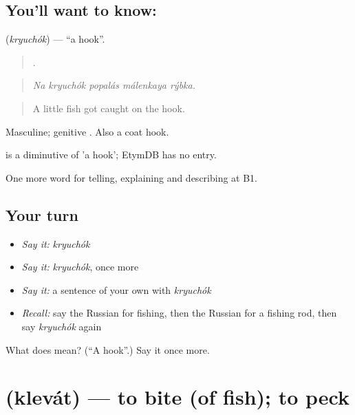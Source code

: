 \subsection*{You'll want to know: }
\textbf{} (\emph{kryuchók}) — \textquotedblleft{}a hook\textquotedblright{}.

\begin{quote}
    .
\end{quote}

\begin{quote}
\emph{Na kryuchók popalás málenkaya rýbka.}
\end{quote}

\begin{quote}
A little fish got caught on the hook.
\end{quote}

Masculine; genitive . Also a coat hook.

\begin{cousinweb}
\emph{} is a diminutive of \emph{} 'a hook'; EtymDB has no entry.
\end{cousinweb}

\begin{grammarlens}[title={What you've built}]
One more word for telling, explaining and describing at B1.
\end{grammarlens}

\subsection*{Your turn}
\begin{itemize}
\raggedright
  \item \emph{Say it:} \emph{kryuchók}
  \item \emph{Say it:} \emph{kryuchók}, once more
  \item \emph{Say it:} a sentence of your own with \emph{kryuchók}
  \item \emph{Recall:} say the Russian for fishing, then the Russian for a fishing rod, then say \emph{kryuchók} again
\end{itemize}

\begin{tcolorbox}[breakable,colback=teal!4,colframe=teal!35!black,title={Before you move on}]
What does  mean? (\textquotedblleft{}A hook\textquotedblright{}.) Say it once more.
\end{tcolorbox}
\section[\texorpdfstring{\ru{клевать} (klevát)}{клевать (klevát)}]{ (klevát) — to bite (of fish); to peck}

